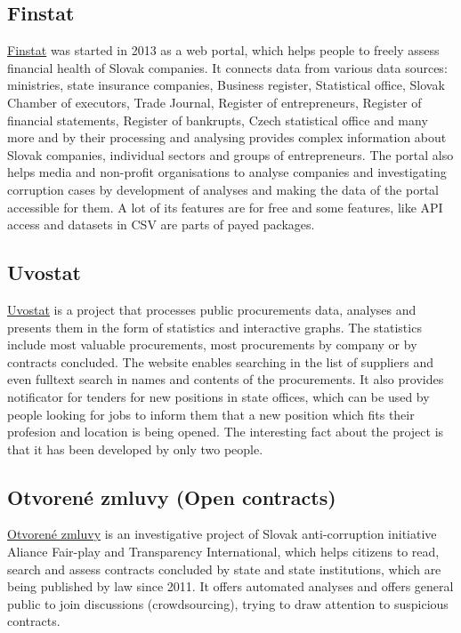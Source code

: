 \documentclass[thesis=B,english]{sprlajur-slovakopendata}[2018/05/12]
\begin{document}
\subsection{Finstat}
\label{finstat}
\href{https://finstat.sk/}{Finstat} was started in 2013 as a web portal, which helps people to freely assess financial health of Slovak companies. It connects data from various data sources: ministries, state insurance companies, Business register, Statistical office, Slovak Chamber of executors, Trade Journal, Register of entrepreneurs, Register of financial statements, Register of bankrupts, Czech statistical office and many more and by their processing and analysing provides complex information about Slovak companies, individual sectors and groups of entrepreneurs. The portal also helps media and non-profit organisations to analyse companies and investigating corruption cases by development of analyses and making the data of the portal accessible for them. A lot of its features are for free and some features, like API access and datasets in CSV are parts of payed packages.
\subsection{Uvostat}
\label{uvostat}
\href{https://www.uvostat.sk/about}{Uvostat} is a project that processes public procurements data, analyses and presents them in the form of statistics and interactive graphs. The statistics include most valuable procurements, most procurements by company or by contracts concluded. The website enables searching in the list of suppliers and even fulltext search in names and contents of the procurements. It also provides notificator for tenders for new positions in state offices, which can be used by people looking for jobs to inform them that a new position which fits their profesion and location is being opened. The interesting fact about the project is that it has been developed by only two people.
\subsection{Otvorené zmluvy (Open contracts)}
\href{http://www.otvorenezmluvy.sk/o-projekte}{Otvorené zmluvy} is an investigative project of Slovak anti-corruption initiative Aliance Fair-play and Transparency International, which helps citizens to read, search and assess contracts concluded by state and state institutions, which are being published by law since 2011. It offers automated analyses and offers general public to join discussions (crowdsourcing), trying to draw attention to suspicious contracts.	
\end{document}
